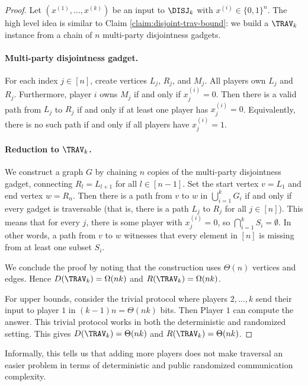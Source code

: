 \begin{proof}
Let $(x^{(1)},\dots,x^{(k)})$ be an input to $\DISJ_k$ with $x^{(i)}\in\{0,1\}^n$. The high level idea is similar to Claim \ref{claim:disjoint-trav-bound}: we build a $\TRAV_k$ instance from a chain of $n$ multi-party disjointness gadgets. 

\paragraph{Multi-party disjointness gadget.} For each index $j \in [n]$, create vertices $L_j$, $R_j$, and $M_j$. All players own $L_j$ and $R_j$. Furthermore, player $i$ owns $M_j$ if and only if $x^{(i)}_j = 0$. Then there is a valid path from $L_j$ to $R_j$ if and only if at least one player has $x_j^{(i)} = 0$. Equivalently, there is no such path if and only if all players have $x_j^{(i)} = 1$.



\paragraph{Reduction to $\TRAV_k$.} We construct a graph $G$ by chaining $n$ copies of the multi-party disjointness gadget, connecting $R_{l} = L_{l+1}$ for all $l \in[n-1]$. Set the start vertex $v = L_1$ and end vertex $w = R_n$. Then there is a path from $v$ to $w$ in $\bigcup_{i=1}^k G_i$ if and only if every gadget is traversable (that is, there is a path $L_j$ to $R_j$ for all $j \in [n]$). This means that for every $j$, there is some player with $x_j^{(i)} = 0$, so $\bigcap_{i=1}^k S_i = \emptyset$. In other words, a path from $v$ to $w$ witnesses that every element in $[n]$ is missing from at least one subset $S_i$.



We conclude the proof by noting that the construction uses $\Theta(n)$ vertices and edges. Hence $D(\TRAV_k) =\Omega(nk)$ and $R(\TRAV_k) = \Omega(nk)$.

For upper bounds, consider the trivial protocol where players $2,\ldots,k$ send their input to player $1$ in $(k-1)n = \Theta(nk)$ bits. Then Player $1$ can compute the answer. This trivial protocol works in both the deterministic and randomized setting. This gives $D(\TRAV_k) = \Theta(nk)$ and $R(\TRAV_k) = \Theta(nk)$.
\end{proof}

Informally, this tells us that adding more players does not make traversal an easier problem in terms of deterministic and public randomized communication complexity.